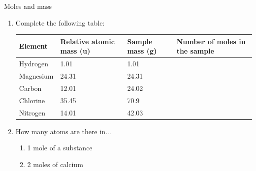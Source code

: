 	\par
\label{m38717*secfhsst!!!underscore!!!id127}
            \begin{exercises}{Moles and mass
      }
            \nopagebreak
      \label{m38717*id276067}\begin{enumerate}[noitemsep, label=\textbf{\arabic*}. ] 
            \label{m38717*uid2}\item 
Complete the following table:
          \begin{table}[H]
        \begin{center}
      \label{m38717*id276082}
    \noindent
      \begin{tabular}{|l|l|l|l|}\hline
\textbf{Element} & \textbf{Relative atomic mass (u)} & \textbf{Sample mass (g)} & \textbf{Number of moles in the sample} \\ \hline
        Hydrogen & 1.01 & 1.01 & \\ \hline
        Magnesium & 24.31 & 24.31 & \\ \hline
        Carbon & 12.01 & 24.02 & \\ \hline
        Chlorine & 35.45 & 70.9 & \\ \hline
        Nitrogen & 14.01 & 42.03 & \\ \hline
    \end{tabular}
      \end{center}
\end{table}
    \par
          \label{m38717*uid3}\item 
How many atoms are there in...
\label{m38717*id276311}\begin{enumerate}[noitemsep, label=\textbf{\alph*}. ] 
            \label{m38717*uid4}\item 1 mole of a substance
\label{m38717*uid5}\item 2 moles of calcium

\end{enumerate}
\end{enumerate}
\end{exercises}
